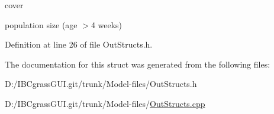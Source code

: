 cover 

population size (age $>$4 weeks) 

Definition at line 26 of file Out\+Structs.\+h.



The documentation for this struct was generated from the following files\+:\begin{DoxyCompactItemize}
\item 
D\+:/\+I\+B\+Cgrass\+G\+U\+I.\+git/trunk/\+Model-\/files/Out\+Structs.\+h\item 
D\+:/\+I\+B\+Cgrass\+G\+U\+I.\+git/trunk/\+Model-\/files/\mbox{\hyperlink{_out_structs_8cpp}{Out\+Structs.\+cpp}}\end{DoxyCompactItemize}
